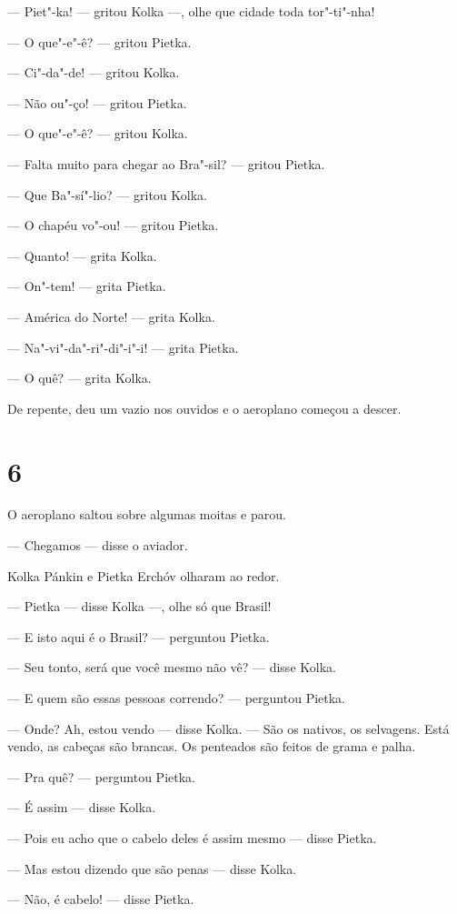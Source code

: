 --- Piet"-ka! --- gritou Kolka ---, olhe que cidade toda tor"-ti"-nha!

--- O que"-e"-ê? --- gritou Pietka.

--- Ci"-da"-de! --- gritou Kolka.

--- Não ou"-ço! --- gritou Pietka.

--- O que"-e"-ê? --- gritou Kolka.

--- Falta muito para chegar ao Bra"-sil? --- gritou Pietka.

--- Que Ba"-sí"-lio? --- gritou Kolka.

--- O chapéu vo"-ou! --- gritou Pietka.

--- Quanto! --- grita Kolka.

--- On"-tem! --- grita Pietka.

--- América do Norte! --- grita Kolka.

--- Na"-vi"-da"-ri"-di"-i"-i! --- grita Pietka.

--- O quê? --- grita Kolka.

De repente, deu um vazio nos ouvidos e o aeroplano come­çou a descer.

\section{6}

O aeroplano saltou sobre algumas moitas e parou.

--- Chegamos --- disse o aviador.

Kolka Pánkin e Pietka Erchóv olharam ao redor.

--- Pietka --- disse Kolka ---, olhe só que Brasil!

--- E isto aqui é o Brasil? --- perguntou Pietka.

--- Seu tonto, será que você mesmo não vê? --- disse Kolka.

--- E quem são essas pessoas correndo? --- perguntou Pietka.

--- Onde? Ah, estou vendo --- disse Kolka. --- São os nativos, os
selvagens. Está vendo, as cabeças são brancas. Os penteados são feitos
de grama e palha.

--- Pra quê? --- perguntou Pietka.

--- É assim --- disse Kolka.

--- Pois eu acho que o cabelo deles é assim mesmo --- disse Pietka.

--- Mas estou dizendo que são penas --- disse Kolka.

--- Não, é cabelo! --- disse Pietka.

